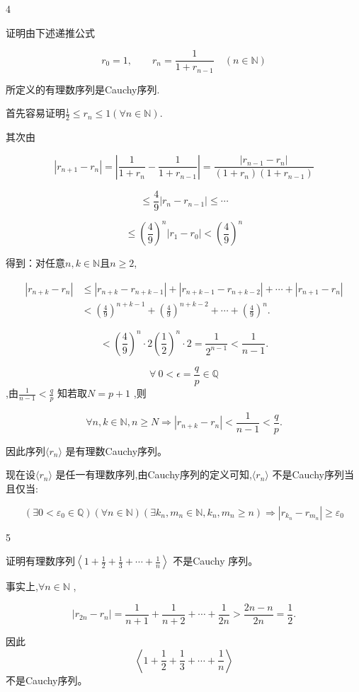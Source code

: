 \begin{sourceexample}{4}

证明由下述递推公式

\[r_0=1,\qquad r_n=\frac{1}{1+r_{n-1}}\quad(n\in\mathbb N)\]

所定义的有理数序列是Cauchy序列.

首先容易证明\(\frac{1}{2} \leqslant r_n \leqslant 1 (\forall n \in \mathbb{N}).\)

其次由

\[|r_{n+1} - r_n| = \left| \frac{1}{1+r_n} - \frac{1}{1+r_{n-1}} \right| = \frac{|r_{n-1} - r_n|}{(1+r_n)(1+r_{n-1})}\]

\[\leq \frac{4}{9} |r_n - r_{n-1}| \leq \cdots\]

\[\leq \left(\frac{4}{9}\right)^n |r_1 - r_0| < \left(\frac{4}{9}\right)^n\]

得到：对任意\(n,k\in\mathbb N\)且\(n\ge2\),

\[\begin{aligned}
	|r_{n+k}-r_n|
	&\le |r_{n+k}-r_{n+k-1}|+|r_{n+k-1}-r_{n+k-2}|+\cdots+|r_{n+1}-r_n|\\
	&<\left(\frac49\right)^{n+k-1}+\left(\frac49\right)^{n+k-2}+\cdots+\left(\frac49\right)^n.
\end{aligned}\]

\[< \left(\frac{4}{9}\right)^n \cdot 2 \left(\frac{1}{2}\right)^n \cdot 2 = \frac{1}{2^{n-1}} < \frac{1}{n-1}.\]

\[\forall \ 0 < \epsilon = \frac{q}{p} \in \mathbb{Q}\] ,由\(\frac{1}{n-1} < \frac{q}{p}\) 知若取\(N = p+1\) ,则

\[\forall n, k \in \mathbb{N}, n \geqslant N \Longrightarrow |r_{n+k} - r_n| < \frac{1}{n-1} < \frac{q}{p}.\]

因此序列\(\langle r_n \rangle\) 是有理数Cauchy序列。

\end{sourceexample}



现在设\(\langle r_n \rangle\) 是任一有理数序列,由Cauchy序列的定义可知,\(\langle r_n \rangle\) 不是Cauchy序列当且仅当:

\[(\exists 0 < \varepsilon_0 \in \mathbb{Q}) (\forall n \in \mathbb{N}) (\exists k_n, m_n \in \mathbb{N}, k_n, m_n \ge n) \Longrightarrow |r_{k_n} - r_{m_n}| \ge \varepsilon_0 \]


\begin{sourceexample}{5}

证明有理数序列\(\left\langle1+\frac{1}{2}+\frac{1}{3}+\cdots+\frac{1}{n}\right\rangle\) 不是Cauchy 序列。

事实上,\(\forall n \in \mathbb{N}\) ,

\[|r_{2n}-r_n|=\frac{1}{n+1}+\frac{1}{n+2}+\cdots+\frac{1}{2n}>\frac{2n-n}{2n}=\frac{1}{2}.\]

因此 \[\left\langle 1 + \frac{1}{2} + \frac{1}{3} + \cdots + \frac{1}{n} \right\rangle\] 不是Cauchy序列。

\end{sourceexample}

